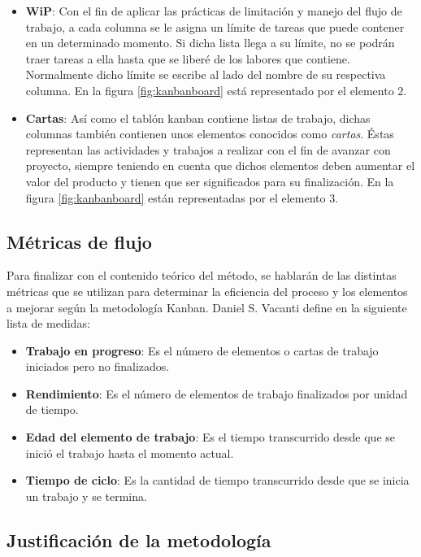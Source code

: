 \begin{itemize}
    \item \textbf{WiP}: Con el fin de aplicar las prácticas de limitación y
    manejo del flujo de trabajo, a cada columna se le asigna un límite de tareas
    que puede contener en un determinado momento. Si dicha lista llega a su
    límite, no se podrán traer tareas a ella hasta que se liberé de los labores
    que contiene. Normalmente dicho límite se escribe al lado del nombre de su
    respectiva columna. En la figura \ref{fig:kanbanboard} está representado por el
    elemento $2$.

    \item \textbf{Cartas}:
    Así como el tablón kanban contiene listas de trabajo, dichas columnas
    también contienen unos elementos conocidos como \emph{cartas}. Éstas
    representan las actividades y trabajos a realizar con el fin de avanzar con
    proyecto, siempre teniendo en cuenta que dichos elementos deben aumentar el
    valor del producto y tienen que ser significados para su finalización. En la
    figura \ref{fig:kanbanboard} están representadas por el elemento $3$.
\end{itemize}

\subsection{Métricas de flujo}
Para finalizar con el contenido teórico del método, se hablarán de las distintas
métricas que se utilizan para determinar la eficiencia del proceso y los
elementos  a mejorar según la metodología Kanban. Daniel S. Vacanti define en
\cite{Daniel2022} la siguiente lista de medidas:

\begin{itemize}
    \item \textbf{Trabajo en progreso}: Es el número de elementos o cartas de
    trabajo iniciados pero no finalizados.
    \item \textbf{Rendimiento}: Es el número de elementos de trabajo finalizados
    por unidad de tiempo.
    \item \textbf{Edad del elemento de trabajo}: Es el tiempo transcurrido desde
    que se inició el trabajo hasta el momento actual.
    \item \textbf{Tiempo de ciclo}: Es la cantidad de tiempo transcurrido desde
    que se inicia un trabajo y se termina.
\end{itemize}

\subsection{Justificación de la metodología}

